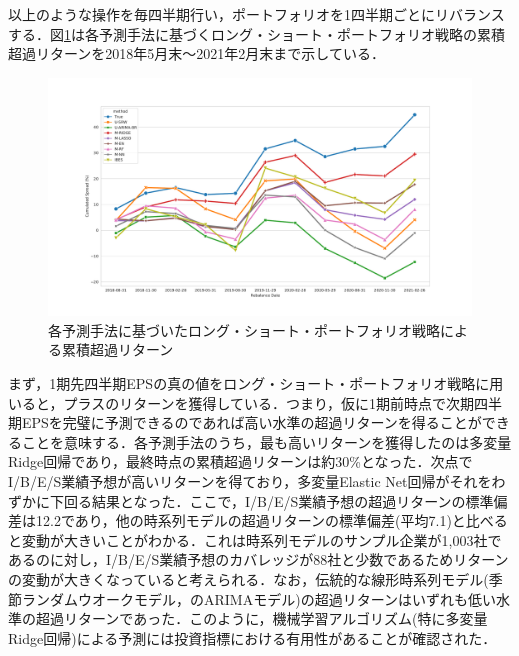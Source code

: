 \documentclass[a4paper，12pt]{jsarticle}
\begin{document}
以上のような操作を毎四半期行い，ポートフォリオを1四半期ごとにリバランスする．図\ref{fig:portfolio_return}は各予測手法に基づくロング・ショート・ポートフォリオ戦略の累積超過リターンを2018年5月末～2021年2月末まで示している．

\begin{figure}
  \centering
  \caption{各予測手法に基づいたロング・ショート・ポートフォリオ戦略による累積超過リターン}
  \label{fig:portfolio_return}
  \includegraphics[width=15cm]{./img/_portfolio_return.pdf}
\end{figure}

まず，1期先四半期EPSの真の値をロング・ショート・ポートフォリオ戦略に用いると，プラスのリターンを獲得している．つまり，仮に1期前時点で次期四半期EPSを完璧に予測できるのであれば高い水準の超過リターンを得ることができることを意味する．各予測手法のうち，最も高いリターンを獲得したのは多変量Ridge回帰であり，最終時点の累積超過リターンは約30\%となった．次点でI/B/E/S業績予想が高いリターンを得ており，多変量Elastic Net回帰がそれをわずかに下回る結果となった．ここで，I/B/E/S業績予想の超過リターンの標準偏差は12.2であり，他の時系列モデルの超過リターンの標準偏差(平均7.1)と比べると変動が大きいことがわかる．これは時系列モデルのサンプル企業が1,003社であるのに対し，I/B/E/S業績予想のカバレッジが88社と少数であるためリターンの変動が大きくなっていると考えられる．なお，伝統的な線形時系列モデル(季節ランダムウオークモデル，\cite{brown1979univariate}のARIMAモデル)の超過リターンはいずれも低い水準の超過リターンであった．このように，機械学習アルゴリズム(特に多変量Ridge回帰)による予測には投資指標における有用性があることが確認された．
\end{document}
